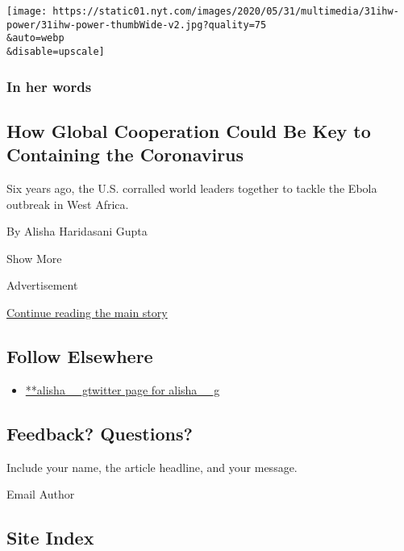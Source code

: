 \begin{enumerate}
  \texttt{[image: https://static01.nyt.com/images/2020/05/31/multimedia/31ihw-power/31ihw-power-thumbWide-v2.jpg?quality=75\\\&auto=webp\\\&disable=upscale]}

  \hypertarget{in-her-words-4}{%
  \subsubsection{In her words}\label{in-her-words-4}}

  \hypertarget{how-global-cooperation-could-be-key-to-containing-the-coronavirus}{%
  \subsection{How Global Cooperation Could Be Key to Containing the
  Coronavirus}\label{how-global-cooperation-could-be-key-to-containing-the-coronavirus}}

  Six years ago, the U.S. corralled world leaders together to tackle the
  Ebola outbreak in West Africa.

  By Alisha Haridasani Gupta
\end{enumerate}

Show More

Advertisement

\protect\hyperlink{after-mid2}{Continue reading the main story}

\hypertarget{follow-elsewhere}{%
\subsection{Follow Elsewhere}\label{follow-elsewhere}}

\begin{itemize}
\tightlist
\item
  \href{https://twitter.com/alisha__g}{**alisha\_\_gtwitter page for
  alisha\_\_g}
\end{itemize}

\hypertarget{feedback-questions}{%
\subsection{Feedback? Questions?}\label{feedback-questions}}

Include your name, the article headline, and your message.

Email Author

\hypertarget{site-index}{%
\subsection{Site Index}\label{site-index}}

